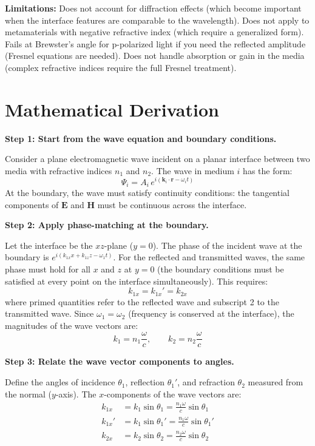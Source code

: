 \textbf{Limitations:} Does not account for diffraction effects (which become important when the interface features are comparable to the wavelength). Does not apply to metamaterials with negative refractive index (which require a generalized form). Fails at Brewster's angle for p-polarized light if you need the reflected amplitude (Fresnel equations are needed). Does not handle absorption or gain in the media (complex refractive indices require the full Fresnel treatment).


\section*{Mathematical Derivation}

\textbf{Step 1: Start from the wave equation and boundary conditions.}

Consider a plane electromagnetic wave incident on a planar interface between two media with refractive indices $n_1$ and $n_2$. The wave in medium $i$ has the form:
\begin{equation}
\Psi_i = A_i\,e^{i(\mathbf{k}_i\cdot\mathbf{r} - \omega_i t)}
\end{equation}
At the boundary, the wave must satisfy continuity conditions: the tangential components of $\mathbf{E}$ and $\mathbf{H}$ must be continuous across the interface.

\textbf{Step 2: Apply phase-matching at the boundary.}

Let the interface be the $xz$-plane ($y = 0$). The phase of the incident wave at the boundary is $e^{i(k_{1x}x + k_{1z}z - \omega_1 t)}$. For the reflected and transmitted waves, the same phase must hold for all $x$ and $z$ at $y = 0$ (the boundary conditions must be satisfied at every point on the interface simultaneously). This requires:
\begin{equation}
k_{1x} = k_{1x}' = k_{2x}
\end{equation}
where primed quantities refer to the reflected wave and subscript 2 to the transmitted wave. Since $\omega_1 = \omega_2$ (frequency is conserved at the interface), the magnitudes of the wave vectors are:
\begin{equation}
k_1 = n_1\frac{\omega}{c}, \qquad k_2 = n_2\frac{\omega}{c}
\end{equation}

\textbf{Step 3: Relate the wave vector components to angles.}

Define the angles of incidence $\theta_1$, reflection $\theta_1'$, and refraction $\theta_2$ measured from the normal ($y$-axis). The $x$-components of the wave vectors are:
\begin{align}
k_{1x} &= k_1\sin\theta_1 = \frac{n_1\omega}{c}\sin\theta_1 \\
k_{1x}' &= k_1\sin\theta_1' = \frac{n_1\omega}{c}\sin\theta_1' \\
k_{2x} &= k_2\sin\theta_2 = \frac{n_2\omega}{c}\sin\theta_2
\end{align}

